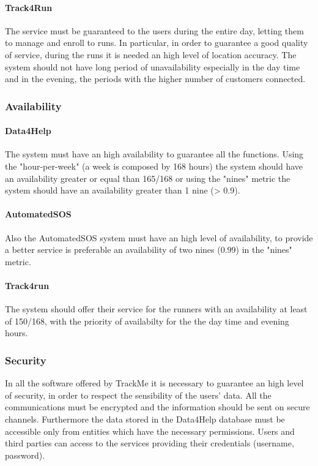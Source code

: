 \documentclass[a4paper]{article}
\begin{document}
    \paragraph{Track4Run} The service must be guaranteed to the users during the entire day, letting them to manage and enroll to runs. In particular, in order to guarantee a good quality of service, during the runs it is needed an high level of location accuracy. The system should not have long period of unavailability especially in the day time and in the evening, the periods with the higher number of customers connected.
    \subsubsection{Availability}
    
    \paragraph{Data4Help} The system must have an high availability to guarantee all the functions. Using the "hour-per-week"  (a week is composed by 168 hours) the system should have an availability greater or equal than 165/168 or using the "nines" metric the system should have an availability greater than 1 nine (> 0.9).
    
    \paragraph{AutomatedSOS} Also the AutomatedSOS system must have an high level of availability, to provide a better service is preferable an availability of two nines (0.99) in the "nines" metric.
    
    \paragraph{Track4run} The system should offer their service for the runners with an availability at least of 150/168, with the priority of availabilty for the the day time and evening hours.
    
    \subsubsection{Security}
    
    In all the software offered by TrackMe it is necessary to guarantee an high level of security, in order to respect the sensibility of the users' data.
    All the communications must be encrypted and the information should be sent on secure channels.
    Furthermore the data stored in the Data4Help database must be accessible only from entities which have the necessary permissions. 
    Users and third parties can access to the services providing their credentials (username, password). 
    
\end{document}
